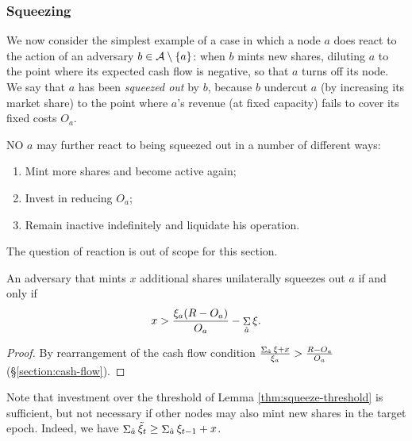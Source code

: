 \subsubsection{Squeezing}
\label{section:squeezing}

We now consider the simplest example of a case in which a node $a$ does react to the action of an adversary $b\in\mathcal{A}\setminus\{a\}$: when $b$ mints new shares, diluting $a$ to the point where its expected cash flow is negative, so that $a$ turns off its node.
%
We say that $a$ has been \emph{squeezed out} by $b$, because $b$ undercut $a$ (by increasing its market share) to the point where $a$'s revenue (at fixed capacity) fails to cover its fixed costs $O_a$.

\begin{remark}
  
  NO $a$ may further react to being squeezed out in a number of different ways:
  \begin{enumerate}
    \item Mint more shares and become active again;
    \item Invest in reducing $O_a$;
    \item Remain inactive indefinitely and liquidate his operation.
  \end{enumerate}
  The question of reaction is out of scope for this section.

\end{remark}

\begin{lemma}
  \label{thm:squeeze-threshold}

  An adversary that mints $x$ additional shares unilaterally squeezes out $a$ if and only if
  \[
    x > \frac { \xi_a(R-O_a) } {O_a} - \mathop{\Sigma}_{\hat{a}}\xi.
  \]

\end{lemma}
%
\begin{proof}

  By rearrangement of the cash flow condition $\frac{\mathop{\Sigma}_{\hat{a}}\xi+x}{\xi_a} > \frac{R-O_a}{O_a}$ (\S\ref{section:cash-flow}). \qedhere

\end{proof}

Note that investment over the threshold of Lemma \ref{thm:squeeze-threshold} is sufficient, but not necessary if other nodes may also mint new shares in the target epoch.
%
Indeed, we have $\mathop{\Sigma}_{\hat{a}}\tilde\xi_{t} \geq \mathop{\Sigma}_{\hat{a}}\xi_{t-1} + x$.

